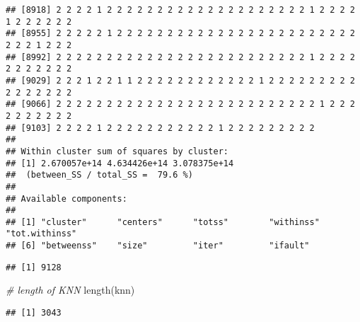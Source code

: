 \documentclass[
]{article}
\newenvironment{Shaded}{\begin{snugshade}}{\end{snugshade}}
\newcommand{\CommentTok}[1]{\textcolor[rgb]{0.56,0.35,0.01}{\textit{#1}}}
\newcommand{\FunctionTok}[1]{\textcolor[rgb]{0.00,0.00,0.00}{#1}}
\newcommand{\NormalTok}[1]{#1}
\newcommand{\SpecialCharTok}[1]{\textcolor[rgb]{0.00,0.00,0.00}{#1}}
\begin{document}
\begin{verbatim}
## [8918] 2 2 2 2 1 2 2 2 2 2 2 2 2 2 2 2 2 2 2 2 2 2 2 2 2 1 2 2 2 2 1 2 2 2 2 2 2
## [8955] 2 2 2 2 2 1 2 2 2 2 2 2 2 2 2 2 2 2 2 2 2 2 2 2 2 2 2 2 2 2 2 2 2 1 2 2 2
## [8992] 2 2 2 2 2 2 2 2 2 2 2 2 2 2 2 2 2 2 2 2 2 2 2 2 2 1 2 2 2 2 2 2 2 2 2 2 2
## [9029] 2 2 2 1 2 2 1 1 2 2 2 2 2 2 2 2 2 2 2 2 1 2 2 2 2 2 2 2 2 2 2 2 2 2 2 2 2
## [9066] 2 2 2 2 2 2 2 2 2 2 2 2 2 2 2 2 2 2 2 2 2 2 2 2 2 2 1 2 2 2 2 2 2 2 2 2 2
## [9103] 2 2 2 2 1 2 2 2 2 2 2 2 2 2 2 2 1 2 2 2 2 2 2 2 2 2
## 
## Within cluster sum of squares by cluster:
## [1] 2.670057e+14 4.634426e+14 3.078375e+14
##  (between_SS / total_SS =  79.6 %)
## 
## Available components:
## 
## [1] "cluster"      "centers"      "totss"        "withinss"     "tot.withinss"
## [6] "betweenss"    "size"         "iter"         "ifault"
\end{verbatim}

\begin{Shaded}
\end{Shaded}

\begin{verbatim}
## [1] 9128
\end{verbatim}

\begin{Shaded}
\begin{Highlighting}[]
\CommentTok{\# length of KNN}
\FunctionTok{length}\NormalTok{(knn)}
\end{Highlighting}
\end{Shaded}

\begin{verbatim}
## [1] 3043
\end{verbatim}
\end{document}
